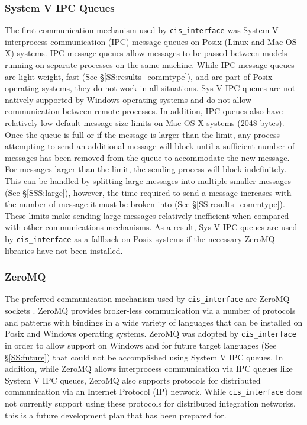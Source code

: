 \documentclass[journal]{IEEEtran}
\newcommand{\cis}{{\tt cis\_interface}{}}
\begin{document}
\subsubsection{System V IPC Queues}\label{SSS:ipc}
%
The first communication mechanism used by {\cis} was System V interprocess 
communication (IPC) message queues \citep{Rusling1999} on Posix (Linux and Mac OS X) systems. 
IPC message queues allow messages to be passed between models running on separate 
processes on the same machine. While IPC message queues are light weight, fast 
(See \S\ref{SS:results_commtype}), and are part of Posix operating systems, they do not work in all 
situations. Sys V IPC queues are not natively supported by Windows operating systems 
and do not allow communication between remote processes. In addition, IPC queues also 
have relatively low default message size limits on Mac OS X systems (2048 bytes). Once 
the queue is full or if the message is larger than the limit, any process attempting to send an additional message will block until a 
sufficient number of messages has been removed from the queue to accommodate the new message. 
For messages larger than the limit, the sending process will block indefinitely. 
This can be handled by splitting large messages into multiple smaller messages 
(See \S\ref{SSS:large}), however, the time required to send a message increases with the number of 
message it must be broken into (See \S\ref{SS:results_commtype}). These limits make sending large messages 
relatively inefficient when compared with other communications mechanisms. 
As a result, Sys V IPC queues are used by 
{\cis} as a fallback on Posix systems if the necessary ZeroMQ libraries have 
not been installed.

\subsubsection{ZeroMQ}\label{SSS:zmq}
%
The preferred communication mechanism used by {\cis} are ZeroMQ sockets 
\citep{Akgul2013}. ZeroMQ 
provides broker-less communication via a number of protocols and patterns with 
bindings in a wide variety of languages that can be installed on Posix and Windows 
operating systems. ZeroMQ was adopted by {\cis} in order to allow support 
on Windows and for future target languages (See \S\ref{SS:future}) that could not be 
accomplished using System V IPC queues. In addition, while ZeroMQ allows 
interprocess communication via IPC queues like System V IPC queues, ZeroMQ also 
supports protocols for distributed communication via an Internet Protocol (IP) 
network. While {\cis} does not currently support using these protocols 
for distributed integration networks, this is a future development plan that has been prepared for.
\end{document}
